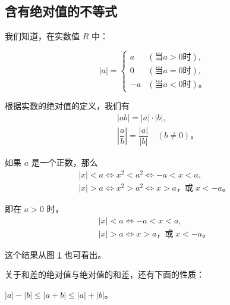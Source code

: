 \subsection{含有绝对值的不等式}\label{subsec:3-5}

我们知道，在实数值 $R$ 中：

$$|a| = \begin{cases}
    a & (\text{当} a > 0 \text{时}), \\
    0 & (\text{当} a = 0 \text{时}), \\
    -a & (\text{当} a < 0 \text{时}) \text{。}
\end{cases}$$

根据实数的绝对值的定义，我们有
\begin{align*}
    & |ab| = |a| \cdot |b|, \\
    & \left| \dfrac{a}{b} \right| = \dfrac{|a|}{|b|} \quad (b \neq 0) \text{。}
\end{align*}

如果 $a$ 是一个正数，那么
\begin{gather*}
    |x| < a \iff x^2 < a^2 \iff -a < x < a, \\
    |x| > a \iff x^2 > a^2 \iff x > a \text{，或} \; x < -a \text{。}
\end{gather*}

即在 $a > 0$ 时，
\begin{gather*}
    |x| < a \iff -a < x < a, \\
    |x| > a \iff x > a \text{，或} \; x < -a \text{。}
\end{gather*}

这个结果从图 \ref{fig:3-4} 也可看出。

\begin{figure}[H]
    \centering
    \begin{minipage}{8cm}
        \centering
        
        \caption*{$|x| < a$ \\ (1)}
    \end{minipage}
    \quad
    \begin{minipage}{8cm}
        \centering
        
        \caption*{$|x| > a$ \\ (2)}
    \end{minipage}
    \caption{}\label{fig:3-4}
\end{figure}

关于和差的绝对值与绝对值的和差，还有下面的性质：

\begin{theorem} \label{theorem:bds-jdz-1}
    $|a| - |b| \leqslant |a + b| \leqslant |a| + |b|$。
\end{theorem}

